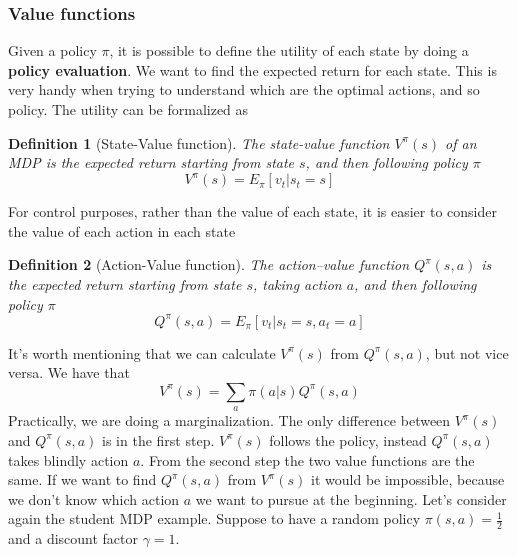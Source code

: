 \documentclass[main.tex]{subfiles}
\newtheorem{definition}{Definition}[section]
\begin{document}
\subsubsection{Value functions}
Given a policy $\pi$, it is possible to define the utility of each state by doing a \textbf{policy evaluation}. We want to find the expected return for each state. This is very handy when trying to understand which are the optimal actions, and so policy. The utility can be formalized as
\begin{definition}[State-Value function]
The state-value function $V^{\pi}(s)$ of an MDP is the expected return starting from state $s$, and then following policy $\pi$
\begin{equation*}
    V^{\pi}(s) = E_{\pi}[v_t|s_t=s]
\end{equation*}
\end{definition}
For control purposes, rather than the value of each state, it is easier to consider the value of each action in each state
\begin{definition}[Action-Value function]
The action–value function $Q^\pi(s, a)$ is the expected return starting from state $s$, taking action $a$,
and then following policy $\pi$
\begin{equation*}
    Q^{\pi}(s,a) = E_{\pi}[v_t|s_t=s, a_t=a]
\end{equation*}
\end{definition}
It's worth mentioning that we can calculate $V^{\pi}(s)$ from $Q^{\pi}(s, a)$, but not vice versa. We have that
\begin{equation}
    V^{\pi}(s) = \sum_a \pi(a|s) Q^{\pi}(s,a)
\end{equation}
Practically, we are doing a marginalization\footnotemark. The only difference between $V^{\pi}(s)$ and $Q^{\pi}(s, a)$ is in the first step. $V^{\pi}(s)$ follows the policy, instead $Q^{\pi}(s, a)$ takes blindly action $a$. From the second step the two value functions are the same. If we want to find $Q^{\pi}(s, a)$ from $V^{\pi}(s)$ it would be impossible, because we don't know which action $a$ we want to pursue at the beginning.
Let's consider again the student MDP example. Suppose to have a random policy $\pi(s,a)=\frac{1}{2}$ \footnotemark{} and a discount factor $\gamma=1$.
\end{document}
